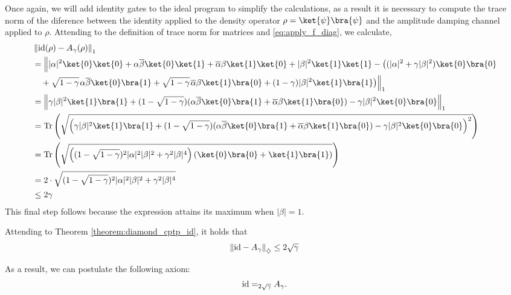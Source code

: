 Once again, we will add identity gates to the ideal program to simplify the calculations, as a result it is necessary to compute the trace norm of the diference between the identity applied to the density operator $\rho = \ket{\psi} \bra{\psi}$ and the amplitude damping channel applied to $\rho$.
Attending to the definition of trace norm for matrices and \autoref{eq:apply_f_diag}, we calculate, 
\begin{align*}
  & \tracenorm{ \id(\rho) - A_{\gamma}(\rho)} \\
  & =    \Big\lVert  |\alpha|^{2} \ket{0} \ket{0} + \alpha \overline{\beta} \ket{0} \ket{1} + \overline{\alpha} \beta \ket{1} \ket{0} + |\beta|^{2} \ket{1} \ket{1}  - \big((|\alpha|^{2} + \gamma |\beta|^{2}) \ket{0}\bra{0} \\ 
  & \hspace{10pt}  +  \sqrt{1-\gamma} \hspace{1pt} \alpha \overline{\beta} \ket{0}\bra{1} + \sqrt{1-\gamma} \hspace{1pt} \overline{\alpha} \beta \ket{1}\bra{0} + (1-\gamma) |\beta|^{2} \ket{1}\bra{1}\big) \Big\rVert_1 \\
   & = \tracenorm{ \gamma |\beta|^{2} \ket{1} \bra{1} + (1-\sqrt{1-\gamma}) (\alpha \overline{\beta} \ket{0} \bra{1} + \overline{\alpha} \beta \ket{1} \bra{0}) - \gamma |\beta|^{2} \ket{0} \bra{0}} \\
   & = \tr \left( \sqrt{\left( \gamma |\beta|^{2} \ket{1} \bra{1} + (1-\sqrt{1-\gamma}) (\alpha \overline{\beta} \ket{0} \bra{1} + \overline{\alpha} \beta \ket{1} \bra{0}) - \gamma |\beta|^{2} \ket{0} \bra{0}  \right)^2}\right) \\
   & = \tr \left( \sqrt{\left( (1-\sqrt{1-\gamma})^{2} |\alpha|^{2}|\beta|^{2} + \gamma^{2} |\beta|^{4} \right) (\ket{0} \bra{0} + \ket{1} \bra{1} ) } \right) \\
   & = 2 \cdot \sqrt{  (1-\sqrt{1-\gamma})^{2} |\alpha|^{2}|\beta|^{2} + \gamma^{2} |\beta|^{4}} \\
   & \leq 2 \gamma
\end{align*}
This final step follows because the expression attains its maximum when 
 $|\beta|=1$.

Attending to Theorem \ref{theorem:diamond_cptp_id}, it holds that
\begin{align*}
  \left\lVert  \mathrm{id} - A_\gamma \right\rVert_{\diamondsuit} \leq 2 \sqrt{\gamma}
\end{align*}

As a result, we can postulate the following axiom:
    \begin{align} \label{eq:amp_damp_teleport}
        \mathrm{id} =_{2 \sqrt{\gamma}} A_\gamma.
    \end{align}


